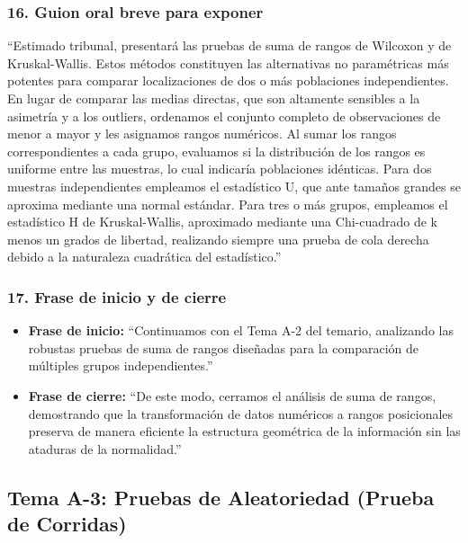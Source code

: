 \documentclass[11pt,a4paper]{article}
\begin{document}
\subsubsection{16. Guion oral breve para exponer}
\begin{guion}
    ``Estimado tribunal, presentará las pruebas de suma de rangos de Wilcoxon y de Kruskal-Wallis. Estos métodos constituyen las alternativas no paramétricas más potentes para comparar localizaciones de dos o más poblaciones independientes. En lugar de comparar las medias directas, que son altamente sensibles a la asimetría y a los outliers, ordenamos el conjunto completo de observaciones de menor a mayor y les asignamos rangos numéricos. Al sumar los rangos correspondientes a cada grupo, evaluamos si la distribución de los rangos es uniforme entre las muestras, lo cual indicaría poblaciones idénticas. Para dos muestras independientes empleamos el estadístico U, que ante tamaños grandes se aproxima mediante una normal estándar. Para tres o más grupos, empleamos el estadístico H de Kruskal-Wallis, aproximado mediante una Chi-cuadrado de k menos un grados de libertad, realizando siempre una prueba de cola derecha debido a la naturaleza cuadrática del estadístico.''
\end{guion}

\subsubsection{17. Frase de inicio y de cierre}
\begin{itemize}
    \item \textbf{Frase de inicio:} ``Continuamos con el Tema A-2 del temario, analizando las robustas pruebas de suma de rangos diseñadas para la comparación de múltiples grupos independientes.''
    \item \textbf{Frase de cierre:} ``De este modo, cerramos el análisis de suma de rangos, demostrando que la transformación de datos numéricos a rangos posicionales preserva de manera eficiente la estructura geométrica de la información sin las ataduras de la normalidad.''
\end{itemize}

\newpage
\subsection{Tema A-3: Pruebas de Aleatoriedad (Prueba de Corridas)}
\end{document}
